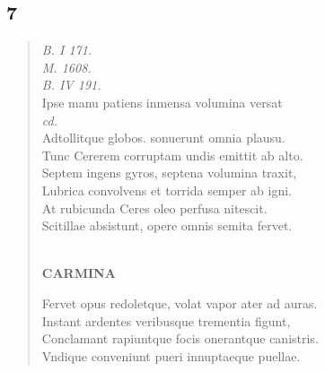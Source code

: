 \documentclass[11pt, a4paper]{report}
\begin{document}
            \subsection*{7}
      \begin{verse}
      \textit{B. I 171.} \\ \textit{M. 1608.} \\ \textit{B. IV 191.} \\ Ipse manu patiens inmensa volumina versat \\ \textit{cd.} \\ Adtollitque globos. sonuerunt omnia plausu. \\ Tunc Cererem corruptam undis emittit ab alto. \\ Septem ingens gyros, septena volumina traxit, \\ Lubrica convolvens et torrida semper ab igni. \\ At rubicunda Ceres oleo perfusa nitescit. \\ Scitillae absistunt, opere omnis semita fervet. \\ 
        ﻿\pagebreak 
    \begin{center} \textbf{CARMINA} \end{center} \marginpar{[34]} Fervet opus redoletque, volat vapor ater ad auras. \\ Instant ardentes veribusque trementia figunt, \\ Conclamant rapiuntque focis onerantque canistris. \\ Vndique conveniunt pueri innuptaeque puellae. \\ 
      \end{verse}
  
\end{document}
